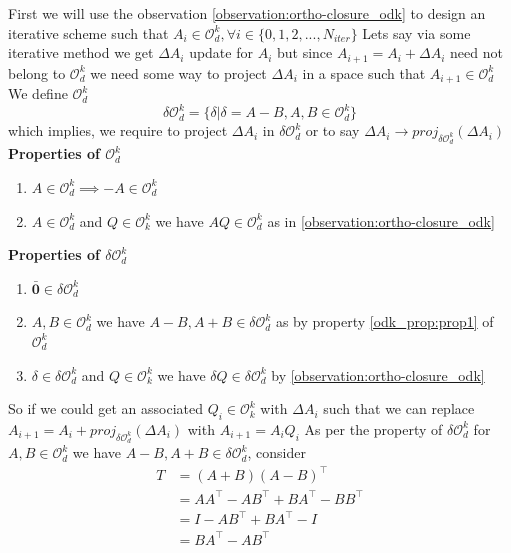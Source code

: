 First we will use the observation \ref{observation:ortho-closure_odk} to design an iterative scheme such that $A_i \in \mathcal{O}_d^k, \forall i \in \{0,1,2,...,N_{iter}\}$
\newline Lets say via some iterative method we get $\Delta A_i$ update for $A_i$ but since $A_{i+1} = A_i + \Delta A_i$ need not belong to $\mathcal{O}_d^k$ we need some way to project $\Delta A_i$ in a space such that $A_{i+1} \in \mathcal{O}_d^k$
\newline We define $\mathcal{O}_d^k$
\begin{equation}
    \delta \mathcal{O}_d^k = \{ \delta | \delta = A - B, A, B \in \mathcal{O}_d^k \}
\end{equation}
which implies, we require to project $\Delta A_i$ in $\delta \mathcal{O}_d^k $ or to say $\Delta A_i \to proj_{\delta \mathcal{O}_d^k}(\Delta A_i)$
\newline \newline \textbf{Properties of $\mathcal{O}_d^k $}
\begin{enumerate}
    \item $A \in \mathcal{O}_d^k \implies -A \in \mathcal{O}_d^k$ \label{odk_prop:prop1}
    \item $A \in \mathcal{O}_d^k$ and $Q\in \mathcal{O}_k^k$ we have $A Q \in \mathcal{O}_d^k$ as in \ref{observation:ortho-closure_odk}
\end{enumerate}
\textbf{Properties of $\delta \mathcal{O}_d^k $}
\begin{enumerate}
    \item $\bar{\textbf{0}} \in \delta \mathcal{O}_d^k$
    \item $A, B \in \mathcal{O}_d^k$ we have $A-B, A+B \in \delta \mathcal{O}_d^k$ as by property \ref{odk_prop:prop1} of $\mathcal{O}_d^k$
    \item $\delta \in \delta \mathcal{O}_d^k$ and $Q\in \mathcal{O}_k^k$ we have $\delta Q \in \delta \mathcal{O}_d^k$ by \ref{observation:ortho-closure_odk}
\end{enumerate}
So if we could get an associated $Q_i \in \mathcal{O}_k^k$ with $\Delta A_i$ such that we can replace $A_{i+1} = A_i+proj_{\delta \mathcal{O}_d^k}(\Delta A_i)$ with $A_{i+1} = A_iQ_i$  
\newline As per the property of $\delta \mathcal{O}_d^k$ for $A, B \in \mathcal{O}_d^k$ we have $A-B, A+B \in \delta \mathcal{O}_d^k$, consider
\begin{equation}
\begin{aligned}
    T &= (A+B)(A-B)^\top \\
      &= AA^\top - AB^\top +BA^\top - BB^\top \\
      &= I - AB^\top +BA^\top - I \\
      &= BA^\top- AB^\top \\
\end{aligned}
\end{equation}
